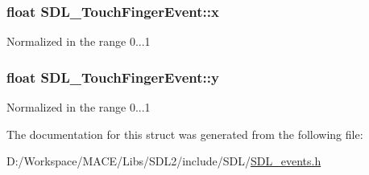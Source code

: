 \subsubsection[{\texorpdfstring{x}{x}}]{\setlength{\rightskip}{0pt plus 5cm}float S\+D\+L\+\_\+\+Touch\+Finger\+Event\+::x}\hypertarget{struct_s_d_l___touch_finger_event_a0ce44b1342220fa17e9b9b4a77c2c906}{}\label{struct_s_d_l___touch_finger_event_a0ce44b1342220fa17e9b9b4a77c2c906}
Normalized in the range 0...1 
\subsubsection[{\texorpdfstring{y}{y}}]{\setlength{\rightskip}{0pt plus 5cm}float S\+D\+L\+\_\+\+Touch\+Finger\+Event\+::y}\hypertarget{struct_s_d_l___touch_finger_event_ac2bb8af638d2927a8e13f6ffe8f9384e}{}\label{struct_s_d_l___touch_finger_event_ac2bb8af638d2927a8e13f6ffe8f9384e}
Normalized in the range 0...1 

The documentation for this struct was generated from the following file\+:\begin{DoxyCompactItemize}
\item 
D\+:/\+Workspace/\+M\+A\+C\+E/\+Libs/\+S\+D\+L2/include/\+S\+D\+L/\hyperlink{_s_d_l__events_8h}{S\+D\+L\+\_\+events.\+h}\end{DoxyCompactItemize}
